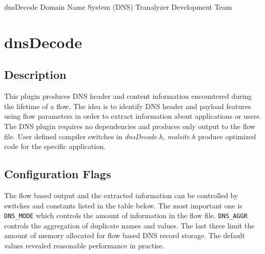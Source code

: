\documentclass[documentation]{subfiles}
\begin{document}
\trantitle
    {dnsDecode}
    {Domain Name System (DNS)}
    {Tranalyzer Development Team}

\section{dnsDecode}\label{s:dnsDecode}

\subsection{Description}
This plugin produces DNS header and content information encountered during the lifetime of a flow.
The idea is to identify DNS header and payload features using flow parameters in order to extract
information about applications or users. The DNS plugin requires no dependencies and produces
only output to the flow file. User defined compiler switches in {\em dnsDecode.h, malsite.h} produce
optimized code for the specific application.

\subsection{Configuration Flags}\label{dnsDecode:config}
The flow based output and the extracted information can be controlled by
switches and constants listed in the table below. The most important one is {\tt DNS\_MODE}
which controls the amount of information in the flow file. {\tt DNS\_AGGR} controls the aggregation
of duplicate names and values. The last three limit the amount of memory allocated for flow based DNS record storage.
The default values revealed reasonable performance in practise.
\end{document}
